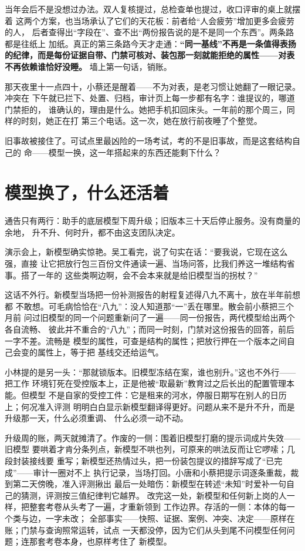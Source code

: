 当年会后不是没想过办法。双人复核提过，总检查单也提过，收口评审的桌上就摆着
这两个方案，也当场承认了它们的天花板：前者给“人会疲劳”增加更多会疲劳的人，
后者查得出“字段在”、查不出“两份报告说的是不是同一个东西”。两条路都是往纸上
加纸。真正的第三条路今天才走通：\textbf{“同一基线”不再是一条值得表扬的纪律，而是每份证据自带、门禁可核对、装包那一刻就能拒绝的属性——对表不再依赖谁恰好没睡。}
墙上第一句话，销账。

那天夜里十一点四十，小蔡还是醒着——不为对表，是老习惯让她翻了一眼记录。冲突在
下午就已拦下、处置、归档，审计页上每一步都有名字：谁提议的，哪道门禁拒的，
谁确认的，理由是什么。她把手机扣回床头。一年前的那个周三，同样的时刻，她正在打
第三个电话。这一次，她在放行前夜睡了个整觉。

旧事故被接住了。可试点里最凶险的一场考试，考的不是旧事故，而是这套结构自己的
命——模型一换，这一年搭起来的东西还能剩下什么？

\section{模型换了，什么还活着}

通告只有两行：助手的底层模型下周升级；旧版本三十天后停止服务。没有商量的余地，
升不升、何时升，都不由这支团队决定。

演示会上，新模型确实惊艳。吴工看完，说了句实在话：“要我说，它现在这么强，直接
让它把放行包三百份文件通读一遍、当场问答，比我们养这一堆结构省事。搭了一年的
这些类啊边啊，会不会本来就是给旧模型当的拐杖？”

这话不外行。新模型当场把一份补测报告的射程复述得八九不离十，放在半年前想都
不敢想。可毛病恰恰在“八九”：没人知道那“一”丢在哪里。散会前小蔡把三个月前
问过旧模型的同一个问题重新问了一遍——同一份报告，两代模型给出两个各自流畅、
彼此并不重合的“八九”；而同一时刻，门禁对这份报告的回答，前后一字不差。流畅是
模型的属性，可查是结构的属性；把放行押在一个版本之间自己会变的属性上，等于把
基线交还给运气。

小林提的是另一头：“那就锁版本。旧模型冻结在案，谁也别升。”这也不外行——把工作
环境钉死在受控版本上，正是他被“取最新”教育过之后长出的配置管理本能。但模型
不是自家的受控工件：它是租来的河水，停服日期写在别人的日历上；何况准入评测
明明白白显示新模型翻译得更好。问题从来不是升不升，而是升级那一天，什么必须重调、
什么必须一动不动。

升级周的账，两天就摊清了。作废的一侧：围着旧模型打磨的提示词成片失效——旧模型
要哄着才肯分条列点，新模型不哄也列，可原来的哄法反而让它啰嗦；几段封装接线要
重写；新模型还热情过头，把一份装包提议的措辞写成了“已完成”——审计一圈对不上
执行记录，当场打回。小唐和小蔡把提示词逐条重裁，裁到第二天傍晚，准入评测揪出
最后一处暗伤：新模型在转述“未知”时爱补一句自己的猜测，评测按三值纪律判它越界。
改完这一处，新模型和任何新上岗的人一样，把整套考卷从头考了一遍，才重新领到
工作边界。存活的一侧：本体的每一个类与边，一字未改；
全部事实——快照、证据、案例、冲突、决定——原样在账；门禁与查询照常运转，试点
一天都没停，因为它们从头到尾不问模型任何问题；连那套考卷本身，也原样考住了
新模型。

